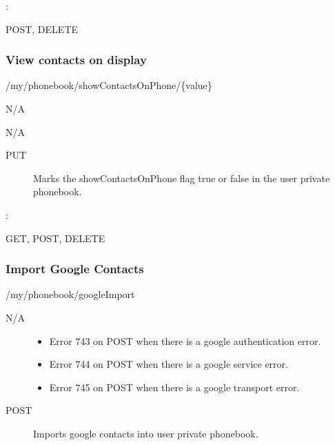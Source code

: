 \documentclass[letterpaper,10pt,english]{sphinxmanual}
\begin{document}
:

\begin{sphinxVerbatim}[commandchars=\\\{\}]
\end{sphinxVerbatim}

 POST, DELETE


\subsubsection{View contacts on display}
\label{\detokenize{restapi:view-contacts-on-display}}
 /my/phonebook/showContactsOnPhone/\{value\}

 N/A

 N/A
\begin{description}
\item[{ PUT}] \leavevmode
Marks the showContactsOnPhone flag true or false in the user private phonebook.

\end{description}

:

\begin{sphinxVerbatim}[commandchars=\\\{\}]
\end{sphinxVerbatim}

 GET, POST, DELETE


\subsubsection{Import Google Contacts}
\label{\detokenize{restapi:import-google-contacts}}
 /my/phonebook/googleImport

 N/A
\begin{description}
\item[{}] \leavevmode\begin{itemize}
\item {} 
Error 743 on POST when there is a google authentication error.

\item {} 
Error 744 on POST when there is a google service error.

\item {} 
Error 745 on POST when there is a google transport error.

\end{itemize}

\item[{ POST}] \leavevmode
Imports google contacts into user private phonebook.

\end{description}
\end{document}
